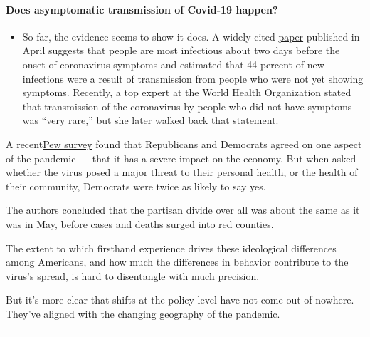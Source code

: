 \begin{itemize}
{  \paragraph{Does asymptomatic transmission of Covid-19
  happen?}\label{does-asymptomatic-transmission-of-covid-19-happen}}

  \begin{itemize}
  \tightlist
  \item
    So far, the evidence seems to show it does. A widely cited
    \href{https://www.nature.com/articles/s41591-020-0869-5}{paper}
    published in April suggests that people are most infectious about
    two days before the onset of coronavirus symptoms and estimated that
    44 percent of new infections were a result of transmission from
    people who were not yet showing symptoms. Recently, a top expert at
    the World Health Organization stated that transmission of the
    coronavirus by people who did not have symptoms was ``very rare,''
    \href{https://www.nytimes.com/2020/06/09/world/coronavirus-updates.html?action=click\&pgtype=Article\&state=default\&region=MAIN_CONTENT_3\&context=storylines_faq\#link-1f302e21}{but
    she later walked back that statement.}
  \end{itemize}
\end{itemize}

A
recent\href{https://www.pewresearch.org/fact-tank/2020/07/22/republicans-remain-far-less-likely-than-democrats-to-view-covid-19-as-a-major-threat-to-public-health/}{Pew
survey} found that Republicans and Democrats agreed on one aspect of the
pandemic --- that it has a severe impact on the economy. But when asked
whether the virus posed a major threat to their personal health, or the
health of their community, Democrats were twice as likely to say yes.

The authors concluded that the partisan divide over all was about the
same as it was in May, before cases and deaths surged into red counties.

The extent to which firsthand experience drives these ideological
differences among Americans, and how much the differences in behavior
contribute to the virus's spread, is hard to disentangle with much
precision.

But it's more clear that shifts at the policy level have not come out of
nowhere. They've aligned with the changing geography of the pandemic.

\begin{center}\rule{0.5\linewidth}{\linethickness}\end{center}

